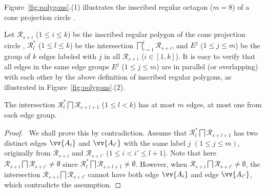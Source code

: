 
Figure~\ref{fig:polygons}.(1) illustrates the inscribed regular octagon ($m=8$) of a cone projection circle .

Let $\mathcal{R}_{s+i}$ ($1\le i \le k$) be the inscribed regular polygon of the cone projection  circle ,
$\mathcal{R}^*_l$ ($1\le l\le k$) be the intersection $\bigsqcap_{i=1}^{l}\mathcal{R}_{s+i}$,
and $E^j$ ($1\le j \le m$) be the group of $k$ edges labeled with $j$ in all $\mathcal{R}_{s+i}$ ($i\in[1, k]$).
%
It is easy to verify that all edges in the same edge groups $E^j$ ($1\le j\le m$) are in parallel (or overlapping) with each other by the above definition of inscribed regular polygons, as illustrated in Figure~\ref{fig:polygons}.(2).


\begin{prop}
\label{prop-rp-intersection}
The intersection $\mathcal{R}^*_{l} \bigsqcap \mathcal{R}_{s+l+1}$ ($ 1\le l< k$) has at most $m$ edges, \ie at most one from each edge group.
\end{prop}





\begin{proof}\
We shall prove this by contradiction.
Assume that $\mathcal{R}^*_{l} \bigsqcap \mathcal{R}_{s+l+1}$ has two distinct edges $\vv{A_i}$ and $\vv{A_{i'}}$  with the same label $j$ $(1\le j \le m)$, originally from
$\mathcal{R}_{s+i}$ and $\mathcal{R}_{s+i'}$  ($1\le i< i' \le l+1$).
%
Note that here $\mathcal{R}_{s+i} \bigsqcap \mathcal{R}_{s+i'} \ne \emptyset$ since $\mathcal{R}^*_l \bigsqcap \mathcal{R}_{s+l+1} \ne \emptyset$.
%
However, when $\mathcal{R}_{s+i} \bigsqcap \mathcal{R}_{s+i'} \ne \emptyset$, the intersection $\mathcal{R}_{s+i} \bigsqcap \mathcal{R}_{s+i'}$ cannot have
both edge $\vv{A_i}$ and edge $\vv{A_{i'}}$, which contradicts the assumption. \eop
\end{proof}


